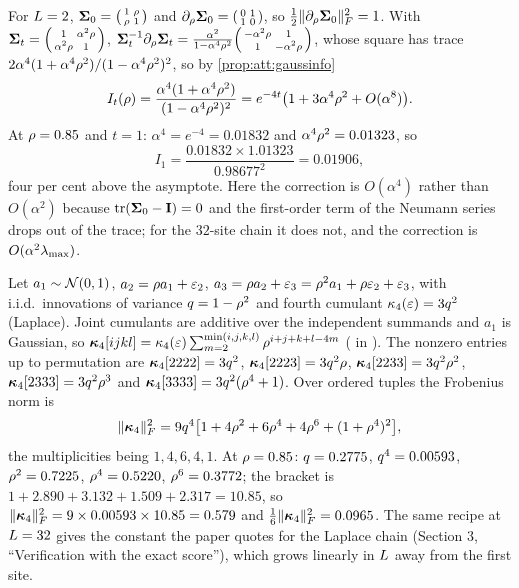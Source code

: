 \begin{example}
\label{ex:att:twosite}
For $L=2$, $\mathbf{\Sigma}_0=\begin{psmallmatrix}1&\rho\\\rho&1\end{psmallmatrix}$ and
$\partial_\rho\mathbf{\Sigma}_0=\begin{psmallmatrix}0&1\\1&0\end{psmallmatrix}$, so
$\tfrac12\lVert \partial_\rho\mathbf{\Sigma}_0 \rVert_{F}^2=1$. With $\mathbf{\Sigma}_t=\begin{psmallmatrix}1&\alpha^2\rho\\\alpha^2\rho&1\end{psmallmatrix}$,
$\mathbf{\Sigma}_t^{-1}\partial_\rho\mathbf{\Sigma}_t=\frac{\alpha^2}{1-\alpha^4\rho^2}\begin{psmallmatrix}-\alpha^2\rho&1\\1&-\alpha^2\rho\end{psmallmatrix}$,
whose square has trace $2\alpha^4(1+\alpha^4\rho^2)/(1-\alpha^4\rho^2)^2$, so by
\cref{prop:att:gaussinfo}
\[
  I_t(\rho)=\frac{\alpha^4(1+\alpha^4\rho^2)}{(1-\alpha^4\rho^2)^2}=e^{-4t}\bigl(1+3\alpha^4\rho^2+O(\alpha^8)\bigr).
\]
At $\rho=0.85$ and $t=1$: $\alpha^4=e^{-4}=0.01832$ and $\alpha^4\rho^2=0.01323$, so
\[
  I_1=\frac{0.01832\times1.01323}{0.98677^2}=0.01906,
\]
four per cent above the asymptote. Here
the correction is $O(\alpha^4)$ rather than $O(\alpha^2)$ because $\operatorname{tr}(\mathbf{\Sigma}_0-\mathbf{I})=0$
and the first-order term of the Neumann series drops out of the trace; for the
$32$-site chain it does not, and the correction is $O(\alpha^2\lambda_{\max})$.
\end{example}

\begin{example}
\label{ex:att:tensor}
Let $a_1\sim\mathcal{N}\!\left(0,1\right)$, $a_2=\rho a_1+\varepsilon_2$, $a_3=\rho a_2+\varepsilon_3=\rho^2a_1+\rho\varepsilon_2+\varepsilon_3$,
with i.i.d.\ innovations of variance $q=1-\rho^2$ and fourth cumulant
$\kappa_4(\varepsilon)=3q^2$ (Laplace). Joint cumulants are additive over the
independent summands and $a_1$ is Gaussian, so
$\bm{\kappa}_4[ijkl]=\kappa_4(\varepsilon)\sum_{m=2}^{\min(i,j,k,l)}\rho^{i+j+k+l-4m}$
( in ). The nonzero entries up
to permutation are $\bm{\kappa}_4[2222]=3q^2$, $\bm{\kappa}_4[2223]=3q^2\rho$,
$\bm{\kappa}_4[2233]=3q^2\rho^2$, $\bm{\kappa}_4[2333]=3q^2\rho^3$ and
$\bm{\kappa}_4[3333]=3q^2(\rho^4+1)$. Over ordered tuples the Frobenius norm is
\[
  \lVert \bm{\kappa}_4 \rVert_{F}^2=9q^4\bigl[1+4\rho^2+6\rho^4+4\rho^6+(1+\rho^4)^2\bigr],
\]
the multiplicities being $1,4,6,4,1$. At $\rho=0.85$: $q=0.2775$, $q^4=0.00593$,
$\rho^2=0.7225$, $\rho^4=0.5220$, $\rho^6=0.3772$; the bracket is
$1+2.890+3.132+1.509+2.317=10.85$, so $\lVert \bm{\kappa}_4 \rVert_{F}^2=9\times0.00593\times10.85=0.579$
and $\tfrac16\lVert \bm{\kappa}_4 \rVert_{F}^2=0.0965$. The same recipe at $L=32$ gives the
constant the paper quotes for the Laplace chain (Section 3, ``Verification with the
exact score''), which grows linearly in $L$ away from the first site.
\end{example}

